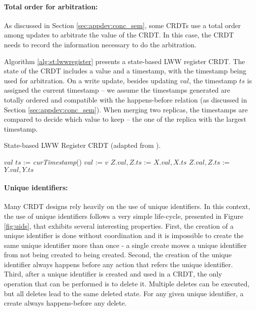 \documentclass[11pt,a4paper]{article}
\begin{document}
\paragraph{Total order for arbitration:}
As discussed in Section \ref{sec:appdev:conc_sem}, some CRDTs use a
total order among updates to arbitrate the value of the CRDT.
In this case, the CRDT needs to record the information necessary to do
the arbitration.

Algorithm \ref{alg:st:lwwregister} presents a state-based LWW register CRDT. 
The state of the CRDT includes a value and a timestamp, with the
timestamp being used for arbitration.
On a write update, besides updating $val$, the timestamp $ts$ is
assigned the current timestamp -- we assume the timestamps generated are 
totally ordered and compatible with the happens-before relation (as discussed in Section \ref{sec:appdev:conc_sem}).
When merging two replicas, the timestamps are compared to decide
which value to keep -- the one of the replica with the largest timestamp.


\begin{algorithm}
\caption{State-based LWW Register CRDT (adapted from \cite{Shapiro11Comprehensive}).}
\label{alg:st:lwwregister}
\begin{algorithmic}[1]
 
\EndPayload
{}
\State \Return $\mathit{val}$
\EndQuery
{}
    \State $\mathit{ts}$ := \emph{curTimestamp}() 
    \State $\mathit{val}$ := $v$
\EndUpdate
{}
    \State $Z.\mathit{val}, Z.\mathit{ts}$ := $X.\mathit{val}, X.\mathit{ts}$
    \Else
    \State $Z.\mathit{val}, Z.\mathit{ts}$ := $Y.\mathit{val}, Y.\mathit{ts}$
    \EndIf
\EndMerge
\end{algorithmic}
\end{algorithm}

\paragraph{Unique identifiers:}
Many CRDT designs rely heavily on the use of unique identifiers.
In this context, the use of unique identifiers follows a very simple life-cycle, 
presented in Figure \ref{fig:uids}, that exhibits several interesting properties.
First, the creation of a unique identifier is done without coordination and
it is impossible to create the same unique identifier more than once -
a single create moves a unique identifier from not being created to being created.
Second, the creation of the unique identifier always happens before any action 
that refers the unique identifier. 
Third, after a unique identifier is created and used in a CRDT, the only operation 
that can be performed is to delete it. Multiple deletes can be executed, but all
deletes lead to the same deleted state.
For any given unique identifier, a create always happens-before any delete.
\end{document}

